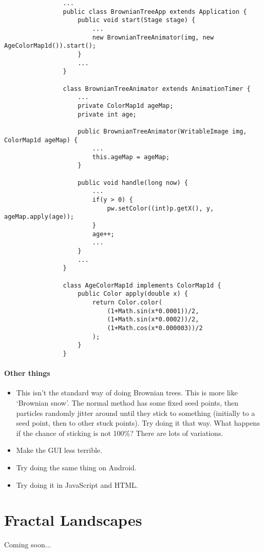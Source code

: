 \documentclass{article}
\begin{document}
            \begin{verbatim}
                ...
                public class BrownianTreeApp extends Application {
                    public void start(Stage stage) {
                        ...
                        new BrownianTreeAnimator(img, new AgeColorMap1d()).start();
                    }
                    ...
                }
                
                class BrownianTreeAnimator extends AnimationTimer {
                    ...
                    private ColorMap1d ageMap;
                    private int age;
                    
                    public BrownianTreeAnimator(WritableImage img, ColorMap1d ageMap) {
                        ...
                        this.ageMap = ageMap;
                    }
                    
                    public void handle(long now) {
                        ...
                        if(y > 0) {
                            pw.setColor((int)p.getX(), y, ageMap.apply(age));
                        }
                        age++;
                        ...
                    }
                    ...
                }
                
                class AgeColorMap1d implements ColorMap1d {
                    public Color apply(double x) {
                        return Color.color(
                            (1+Math.sin(x*0.0001))/2, 
                            (1+Math.sin(x*0.0002))/2, 
                            (1+Math.cos(x*0.000003))/2
                        );
                    }
                }
            \end{verbatim}
        
        \paragraph{Other things}
            \begin{itemize}
                \item This isn't the standard way of doing Brownian trees. This is more like `Brownian snow'. The normal method has some
                fixed seed points, then particles randomly jitter around until they stick to something (initially to a seed point, then to
                other stuck points). Try doing it that way. What happens if the chance of sticking is not 100\%? There are lots of
                variations.
                \item Make the GUI less terrible.
                \item Try doing the same thing on Android.
                \item Try doing it in JavaScript and HTML.                
            \end{itemize}
            
    \newpage
    \section{Fractal Landscapes}
        Coming soon...
\end{document}
